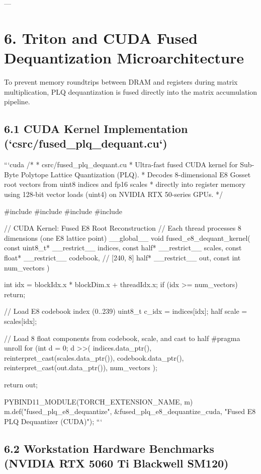 \documentclass[11pt,twoside,openright]{amsbook}
\begin{document}
{{{{{---

\section{6. Triton and CUDA Fused Dequantization Microarchitecture}

To prevent memory roundtrips between DRAM and registers during matrix multiplication, PLQ dequantization is fused directly into the matrix accumulation pipeline.

\subsection{6.1 CUDA Kernel Implementation (`csrc/fused_plq_dequant.cu`)}

```cuda
/*
 * csrc/fused_plq_dequant.cu
 * Ultra-fast fused CUDA kernel for Sub-Byte Polytope Lattice Quantization (PLQ).
 * Decodes 8-dimensional E8 Gosset root vectors from uint8 indices and fp16 scales
 * directly into register memory using 128-bit vector loads (uint4) on NVIDIA RTX 50-series GPUs.
 */

#include 
#include 
#include 
#include 

// CUDA Kernel: Fused E8 Root Reconstruction
// Each thread processes 8 dimensions (one E8 lattice point)
__global__ void fused_e8_dequant_kernel(
    const uint8_t* __restrict__ indices,
    const half* __restrict__ scales,
    const float* __restrict__ codebook, // [240, 8]
    half* __restrict__ out,
    const int num_vectors
) {
    int idx = blockIdx.x * blockDim.x + threadIdx.x;
    if (idx >= num_vectors) return;

    // Load E8 codebook index (0..239)
    uint8_t c_idx = indices[idx];
    half scale = scales[idx];

    // Load 8 float components from codebook, scale, and cast to half
    #pragma unroll
    for (int d = 0; d >>(
        indices.data_ptr(),
        reinterpret_cast(scales.data_ptr()),
        codebook.data_ptr(),
        reinterpret_cast(out.data_ptr()),
        num_vectors
    );

    return out;
}

PYBIND11_MODULE(TORCH_EXTENSION_NAME, m) {
    m.def("fused_plq_e8_dequantize", &fused_plq_e8_dequantize_cuda, "Fused E8 PLQ Dequantizer (CUDA)");
}
```

\subsection{6.2 Workstation Hardware Benchmarks (NVIDIA RTX 5060 Ti Blackwell SM120)}

}}}}}
\end{document}
